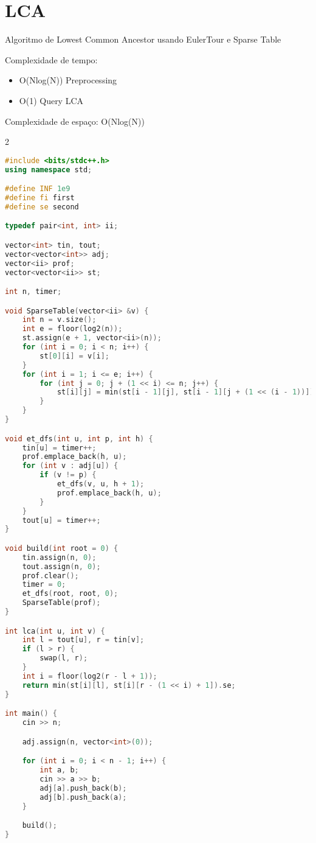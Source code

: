 \documentclass[11pt, a4paper, oneside]{book}
\begin{document}
\section{LCA}


Algoritmo de Lowest Common Ancestor usando EulerTour e Sparse Table



Complexidade de tempo:



\begin{itemize}
\item O(Nlog(N)) Preprocessing
\item O(1) Query LCA
\end{itemize}



Complexidade de espaço: O(Nlog(N))

\hfill

\begin{multicols}{2}
\begin{lstlisting}[language=C++]
#include <bits/stdc++.h>
using namespace std;

#define INF 1e9
#define fi first
#define se second

typedef pair<int, int> ii;

vector<int> tin, tout;
vector<vector<int>> adj;
vector<ii> prof;
vector<vector<ii>> st;

int n, timer;

void SparseTable(vector<ii> &v) {
    int n = v.size();
    int e = floor(log2(n));
    st.assign(e + 1, vector<ii>(n));
    for (int i = 0; i < n; i++) {
        st[0][i] = v[i];
    }
    for (int i = 1; i <= e; i++) {
        for (int j = 0; j + (1 << i) <= n; j++) {
            st[i][j] = min(st[i - 1][j], st[i - 1][j + (1 << (i - 1))]);
        }
    }
}

void et_dfs(int u, int p, int h) {
    tin[u] = timer++;
    prof.emplace_back(h, u);
    for (int v : adj[u]) {
        if (v != p) {
            et_dfs(v, u, h + 1);
            prof.emplace_back(h, u);
        }
    }
    tout[u] = timer++;
}

void build(int root = 0) {
    tin.assign(n, 0);
    tout.assign(n, 0);
    prof.clear();
    timer = 0;
    et_dfs(root, root, 0);
    SparseTable(prof);
}

int lca(int u, int v) {
    int l = tout[u], r = tin[v];
    if (l > r) {
        swap(l, r);
    }
    int i = floor(log2(r - l + 1));
    return min(st[i][l], st[i][r - (1 << i) + 1]).se;
}

int main() {
    cin >> n;

    adj.assign(n, vector<int>(0));

    for (int i = 0; i < n - 1; i++) {
        int a, b;
        cin >> a >> b;
        adj[a].push_back(b);
        adj[b].push_back(a);
    }

    build();
}
\end{lstlisting}
\end{multicols}
\end{document}
